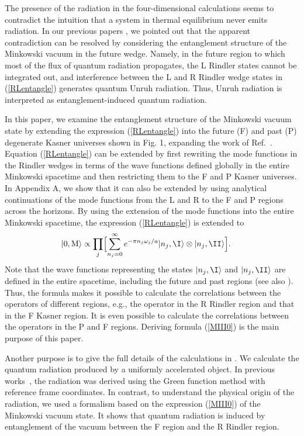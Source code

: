 \documentclass[aps,prd,preprintnumbers,nofootinbib,showpacs]{revtex4}%
\begin{document}
\begin{widetext}
The presence of the radiation in 
the four-dimensional calculations seems to contradict the intuition that a system in thermal equilibrium
never emits radiation. In our previous papers \cite{IOTYZ, ITUY}, we 
pointed out that the apparent contradiction can be resolved by considering
the entanglement structure of the Minkowski vacuum in the future wedge.
Namely, in the future region to which most of the flux of quantum radiation propagates, 
the L Rindler states cannot be integrated out, and 
interference between the L and R Rindler wedge states in  (\ref{RLentangle}) 
 generates quantum Unruh radiation.
Thus, Unruh radiation is interpreted as entanglement-induced quantum radiation.

In this paper, we examine the entanglement structure of the Minkowski vacuum state
by extending the expression (\ref{RLentangle}) into the future (F) and past (P) degenerate Kasner universes 
shown in Fig. 1, expanding the work of Ref.~\cite{Higuchi}.
Equation (\ref{RLentangle}) can be extended by first rewriting the mode functions
in the Rindler wedges in terms of the wave functions defined globally 
in the entire Minkowski spacetime and then restricting them to the F and P Kasner universes. 
In Appendix A, we show that 
it can also be extended by using analytical continuations of the mode functions
from the L and R to the F and P regions across the horizons. 
By using the extension of the mode functions into the entire Minkowski spacetime, 
the expression (\ref{RLentangle}) is extended to 
\begin{eqnarray}
\hspace{-5mm}
  |0,{\rm M}\rangle \propto \prod_j\Bigl[
\sum_{n_j=0}^\infty e^{-\pi n_j \omega_j/a }|n_j,{\I}\rangle \otimes|n_j,{\II}\rangle
\Bigr]  .
\label{MIII0}
\end{eqnarray} 
Note that the wave functions representing the states $|n_j,{\I}\rangle$ and $|n_j,{\II}\rangle$ 
are defined in the entire spacetime, including the future and past regions (see also \cite{OlsonRalph}).
Thus, the formula makes it possible to calculate the correlations between the operators of 
different regions, e.g., the operator in the R Rindler region and that in the F Kasner region. 
It is even possible to calculate the correlations between the operators in the P and F regions. 
Deriving formula (\ref{MIII0}) is the main purpose of this paper. 


Another purpose is to give the full details of the calculations in \cite{ITUY}.
We calculate the quantum radiation produced by a uniformly accelerated object.
In previous works~\cite{LH,LH2}, the radiation was derived using the Green function 
method with reference frame coordinates.
In contrast, to understand the physical origin of the radiation, 
we used a formalism based on the expression (\ref{MIII0}) of the Minkowski vacuum state.
It shows that quantum radiation is induced by entanglement of the vacuum
between the F region and the R Rindler region. 


\end{widetext}
\end{document}
